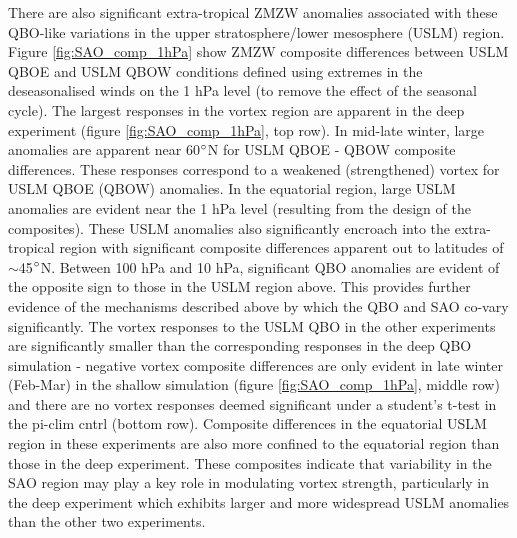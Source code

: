 There are also significant extra-tropical ZMZW anomalies associated with these QBO-like variations in the upper stratosphere/lower mesosphere (USLM) region. Figure \ref{fig:SAO_comp_1hPa} show ZMZW composite differences between USLM QBOE and USLM QBOW conditions defined using extremes in the deseasonalised winds on the 1 hPa level (to remove the effect of the seasonal cycle). The largest responses in the vortex region are apparent in the deep experiment (figure \ref{fig:SAO_comp_1hPa}, top row). In mid-late winter, large anomalies are apparent near 60$\degree$N for USLM QBOE - QBOW composite differences. These responses correspond to a weakened (strengthened) vortex for USLM QBOE (QBOW) anomalies. In the equatorial region, large USLM anomalies are evident near the 1 hPa level (resulting from the design of the composites). These USLM anomalies also significantly encroach into the extra-tropical region with significant composite differences apparent out to latitudes of $\sim$45$\degree$N. Between 100 hPa and 10 hPa, significant QBO anomalies are evident of the opposite sign to those in the USLM region above. This provides further evidence of the mechanisms described above by which the QBO and SAO co-vary significantly. The vortex responses to the USLM QBO in the other experiments are significantly smaller than the corresponding responses in the deep QBO simulation - negative vortex composite differences are only evident in late winter (Feb-Mar) in the shallow simulation (figure \ref{fig:SAO_comp_1hPa}, middle row) and there are no vortex responses deemed significant under a student's t-test in the pi-clim cntrl (bottom row). Composite differences in the equatorial USLM region in these experiments are also more confined to the equatorial region than those in the deep experiment. These composites indicate that variability in the SAO region may play a key role in modulating vortex strength, particularly in the deep experiment which exhibits larger and more widespread USLM anomalies than the other two experiments.
\newpage
